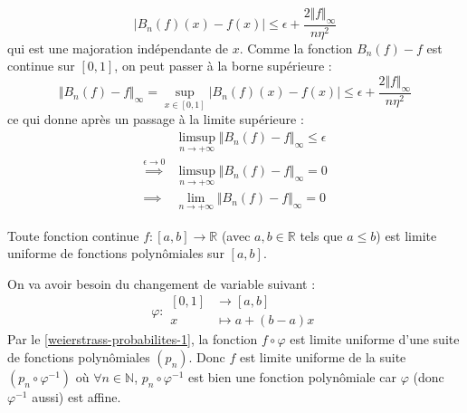 \begin{demonstration}
		\[ |B_n(f)(x) - f(x)| \leq \epsilon + \frac{2 \Vert f \Vert_\infty}{n \eta^2} \]
		qui est une majoration indépendante de $x$. Comme la fonction $B_n(f) - f$ est continue sur $[0, 1]$, on peut passer à la borne supérieure :
		\[ \Vert B_n(f) - f \Vert_\infty = \sup_{x \in [0, 1]} |B_n(f)(x) - f(x)| \leq \epsilon + \frac{2 \Vert f \Vert_\infty}{n \eta^2} \]
		ce qui donne après un passage à la limite supérieure :
		\begin{align*}
			&\limsup_{n \rightarrow +\infty} \Vert B_n(f) - f \Vert_\infty \leq \epsilon \\
			\overset{\epsilon \longrightarrow 0}{\implies} &\limsup_{n \rightarrow +\infty} \Vert B_n(f) - f \Vert_\infty = 0 \\
			\implies &\lim_{n \rightarrow +\infty} \Vert B_n(f) - f \Vert_\infty = 0
		\end{align*}
	\end{demonstration}

	\begin{theorem}[Weierstrass]
		Toute fonction continue $f : [a,b] \rightarrow \mathbb{R}$ (avec $a, b \in \mathbb{R}$ tels que $a \leq b$) est limite uniforme de fonctions polynômiales sur $[a, b]$.
	\end{theorem}

	\begin{demonstration}
		On va avoir besoin du changement de variable suivant :
		\[ \varphi :
		\begin{array}{cl}
			[0,1] &\rightarrow [a, b] \\
			x &\mapsto a + (b-a) x
		\end{array}
		\]
		Par le \cref{weierstrass-probabilites-1}, la fonction $f \circ \varphi$ est limite uniforme d'une suite de fonctions polynômiales $(p_n)$. Donc $f$ est limite uniforme de la suite $(p_n \circ \varphi^{-1})$ où $\forall n \in \mathbb{N}$, $p_n \circ \varphi^{-1}$ est bien une fonction polynômiale car $\varphi$ (donc $\varphi^{-1}$ aussi) est affine.
	\end{demonstration}

